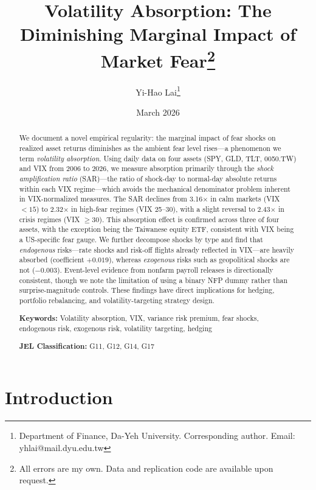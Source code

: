 \documentclass[12pt,a4paper]{article}
\title{Volatility Absorption: The Diminishing Marginal Impact of Market Fear\thanks{All errors are my own. Data and replication code are available upon request.}}
\author{Yi-Hao Lai\thanks{Department of Finance, Da-Yeh University. Corresponding author. Email: yhlai@mail.dyu.edu.tw}}
\date{March 2026}
\begin{document}
\maketitle

\begin{abstract}
\noindent
We document a novel empirical regularity: the marginal impact of fear shocks on realized asset returns diminishes as the ambient fear level rises---a phenomenon we term \textit{volatility absorption}. Using daily data on four assets (SPY, GLD, TLT, 0050.TW) and VIX from 2006 to 2026, we measure absorption primarily through the \textit{shock amplification ratio} (SAR)---the ratio of shock-day to normal-day absolute returns within each VIX regime---which avoids the mechanical denominator problem inherent in VIX-normalized measures. The SAR declines from 3.16$\times$ in calm markets (VIX $< 15$) to 2.32$\times$ in high-fear regimes (VIX 25--30), with a slight reversal to 2.43$\times$ in crisis regimes (VIX $\geq 30$). This absorption effect is confirmed across three of four assets, with the exception being the Taiwanese equity ETF, consistent with VIX being a US-specific fear gauge. We further decompose shocks by type and find that \textit{endogenous} risks---rate shocks and risk-off flights already reflected in VIX---are heavily absorbed (coefficient $+0.019$), whereas \textit{exogenous} risks such as geopolitical shocks are not ($-0.003$). Event-level evidence from nonfarm payroll releases is directionally consistent, though we note the limitation of using a binary NFP dummy rather than surprise-magnitude controls. These findings have direct implications for hedging, portfolio rebalancing, and volatility-targeting strategy design.

\medskip
\noindent
\textbf{Keywords:} Volatility absorption, VIX, variance risk premium, fear shocks, endogenous risk, exogenous risk, volatility targeting, hedging

\medskip
\noindent
\textbf{JEL Classification:} G11, G12, G14, G17
\end{abstract}

\newpage
\tableofcontents
\newpage

\section{Introduction}
\label{sec:intro}
\end{document}

